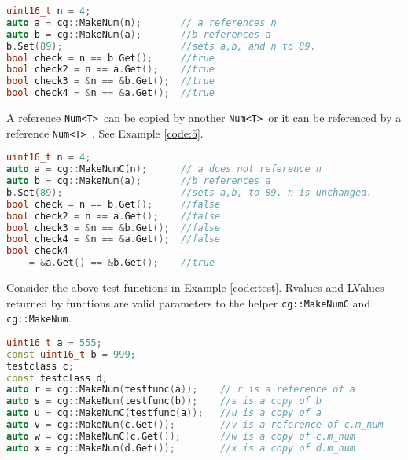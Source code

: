 \documentclass{article}
\newcommand{\theobj}{\protect\Verb+Num<T> +}
\begin{document}
\begin{lstlisting}[language=C++, label=code:4, caption=MakeNum with cg::MakeNum]
uint16_t n = 4;
auto a = cg::MakeNum(n);       // a references n
auto b = cg::MakeNum(a);       //b references a
b.Set(89);                     //sets a,b, and n to 89.
bool check = n == b.Get();     //true
bool check2 = n == a.Get();    //true
bool check3 = &n == &b.Get();  //true
bool check4 = &n == &a.Get();  //true
\end{lstlisting}
\pagebreak
A reference \theobj can be copied by another \theobj or it can be referenced by a reference \theobj. See Example \vref{code:5}.

\begin{lstlisting}[language=C++, label=code:5, caption=Referencing a Copy]
uint16_t n = 4;
auto a = cg::MakeNumC(n);      // a does not reference n
auto b = cg::MakeNum(a);       //b references a
b.Set(89);                     //sets a,b, to 89. n is unchanged.
bool check = n == b.Get();     //false
bool check2 = n == a.Get();    //false
bool check3 = &n == &b.Get();  //false
bool check4 = &n == &a.Get();  //false
bool check4 
	= &a.Get() == &b.Get();    //true
\end{lstlisting}

Consider the above test functions in Example \vref{code:test}.  Rvalues and LValues returned by functions are valid parameters to the helper \Verb+cg::MakeNumC+ and \Verb+cg::MakeNum+.

\begin{lstlisting}[language=C++, label=code:5, caption=Rval and Lval returns]
uint16_t a = 555;
const uint16_t b = 999;
testclass c;
const testclass d;
auto r = cg::MakeNum(testfunc(a));    // r is a reference of a
auto s = cg::MakeNum(testfunc(b));    //s is a copy of b
auto u = cg::MakeNumC(testfunc(a));   //u is a copy of a
auto v = cg::MakeNum(c.Get());        //v is a reference of c.m_num
auto w = cg::MakeNumC(c.Get());       //w is a copy of c.m_num
auto x = cg::MakeNum(d.Get());        //x is a copy of d.m_num
\end{lstlisting}
\end{document}
